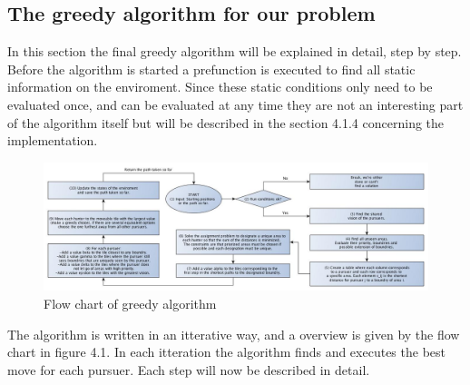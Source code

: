 \subsection{The greedy algorithm for our problem}
In this section the final greedy algorithm will be explained in detail, step by step. Before the algorithm is started a prefunction is executed to find all static information on the enviroment. Since these static conditions only need to be evaluated once, and can be evaluated at any time they are not an interesting part of the algorithm itself but will be described in the section 4.1.4 concerning the implementation.
\begin{figure}[!h]
	\centering
	\includegraphics[width=\textwidth]{chapter_4_methods/greedy_uml3.jpg}
  	\caption[Flow chart of greedy algorithm]
  	{Flow chart of greedy algorithm}
\end{figure}

The algorithm is written in an itterative way, and a overview is given by the flow chart in figure 4.1. In each itteration the algorithm finds and executes the best move for each pursuer. Each step will now be described in detail.

